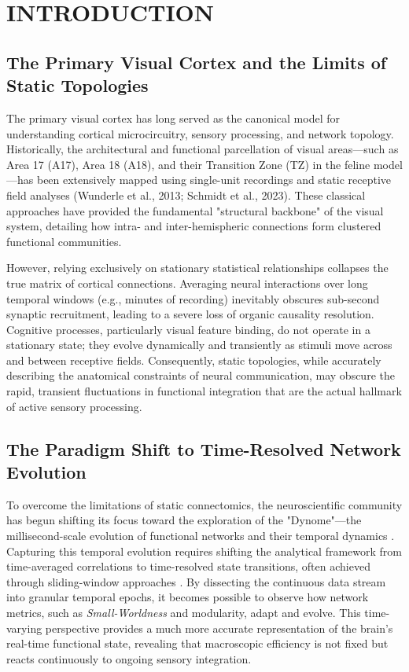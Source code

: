 \chapter{INTRODUCTION}

\section{The Primary Visual Cortex and the Limits of Static Topologies}
The primary visual cortex has long served as the canonical model for understanding cortical microcircuitry, sensory processing, and network topology. Historically, the architectural and functional parcellation of visual areas—such as Area 17 (A17), Area 18 (A18), and their Transition Zone (TZ) in the feline model—has been extensively mapped using single-unit recordings and static receptive field analyses (Wunderle et al., 2013; Schmidt et al., 2023). These classical approaches have provided the fundamental "structural backbone" of the visual system, detailing how intra- and inter-hemispheric connections form clustered functional communities. 


However, relying exclusively on stationary statistical relationships collapses the true matrix of cortical connections. Averaging neural interactions over long temporal windows (e.g., minutes of recording) inevitably obscures sub-second synaptic recruitment, leading to a severe loss of organic causality resolution. Cognitive processes, particularly visual feature binding, do not operate in a stationary state; they evolve dynamically and transiently as stimuli move across and between receptive fields. Consequently, static topologies, while accurately describing the anatomical constraints of neural communication, may obscure the rapid, transient fluctuations in functional integration that are the actual hallmark of active sensory processing.

\section{The Paradigm Shift to Time-Resolved Network Evolution}
To overcome the limitations of static connectomics, the neuroscientific community has begun shifting its focus toward the exploration of the "Dynome"—the millisecond-scale evolution of functional networks and their temporal dynamics \cite{kopell2014}. Capturing this temporal evolution requires shifting the analytical framework from time-averaged correlations to time-resolved state transitions, often achieved through sliding-window approaches \cite{allen2014}. By dissecting the continuous data stream into granular temporal epochs, it becomes possible to observe how network metrics, such as \textit{Small-Worldness} and modularity, adapt and evolve. This time-varying perspective provides a much more accurate representation of the brain's real-time functional state, revealing that macroscopic efficiency is not fixed but reacts continuously to ongoing sensory integration.

